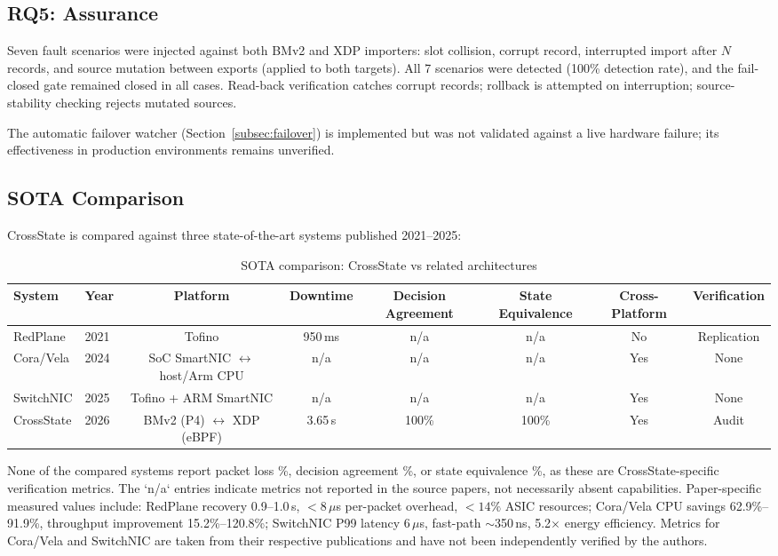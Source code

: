\documentclass[10pt, conference, compsoc]{IEEEtran}
\begin{document}
\subsection{RQ5: Assurance}
\label{subsec:rq5}
Seven fault scenarios were injected against both BMv2 and XDP importers: slot
collision, corrupt record, interrupted import after $N$ records, and source
mutation between exports (applied to both targets). All 7 scenarios were
detected (100\% detection rate), and the fail-closed gate remained closed in
all cases. Read-back verification catches corrupt records; rollback is
attempted on interruption; source-stability checking rejects mutated sources.

The automatic failover watcher (Section~\ref{subsec:failover}) is implemented
but was not validated against a live hardware failure; its effectiveness in
production environments remains unverified.

\subsection{SOTA Comparison}
\label{subsec:sota}
CrossState is compared against three state-of-the-art systems published
2021--2025:

\begin{table}[htbp]
\centering
\footnotesize
\caption{SOTA comparison: CrossState vs related architectures}
\label{tab:sota}
\begin{tabular}{@{}llcccccc@{}}
\toprule
System & Year & Platform & Downtime & Decision Agreement & State Equivalence & Cross-Platform & Verification \\
\midrule
RedPlane & 2021 & Tofino & 950\,ms & n/a & n/a & No & Replication \\
Cora/Vela & 2024 & SoC SmartNIC $\leftrightarrow$ host/Arm CPU & n/a & n/a & n/a & Yes & None \\
SwitchNIC & 2025 & Tofino + ARM SmartNIC & n/a & n/a & n/a & Yes & None \\
CrossState & 2026 & BMv2 (P4) $\leftrightarrow$ XDP (eBPF) & 3.65\,s & 100\% & 100\% & Yes & Audit \\
\bottomrule
\end{tabular}
\end{table}

None of the compared systems report packet loss \%, decision agreement \%, or
state equivalence \%, as these are CrossState-specific verification metrics.
The `n/a` entries indicate metrics not reported in the source papers, not
necessarily absent capabilities. Paper-specific measured values include:
RedPlane recovery 0.9--1.0\,s, $<8\,\mu$s per-packet overhead, $<14\%$ ASIC
resources; Cora/Vela CPU savings 62.9\%--91.9\%, throughput improvement
15.2\%--120.8\%; SwitchNIC P99 latency 6\,$\mu$s, fast-path $\sim$350\,ns,
5.2$\times$ energy efficiency. Metrics for Cora/Vela and SwitchNIC are taken
from their respective publications and have not been independently verified by
the authors.
\end{document}
